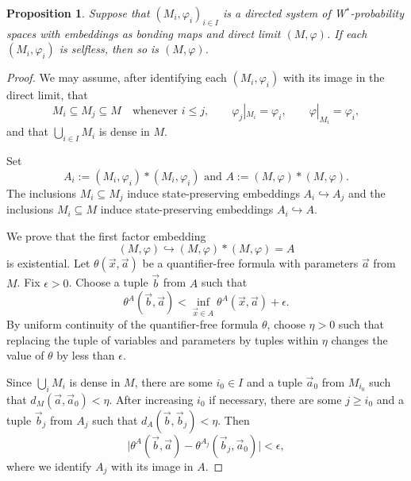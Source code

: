 \documentclass[12pt]{amsart}
\newtheorem{prop}[thm]{Proposition}
\theoremstyle{definition}
\begin{document}
\begin{prop}\label{limit}
Suppose that $(M_i,\varphi_i)_{i\in I}$ is a directed system of W$^*$-probability spaces with embeddings as bonding maps and direct limit $(M,\varphi)$.  If each $(M_i,\varphi_i)$ is selfless, then so is $(M,\varphi)$.
\end{prop}

\begin{proof}
We may assume, after identifying each $(M_i,\varphi_i)$ with its image in the direct limit, that
\[
        M_i\subseteq M_j\subseteq M
        \quad\text{whenever }i\leq j,
        \qquad
        \varphi_j|_{M_i}=\varphi_i,
        \qquad
        \varphi|_{M_i}=\varphi_i,
\]
and that $\bigcup_{i\in I}M_i$ is dense in $M$.

Set
$$A_i:=(M_i,\varphi_i)*(M_i,\varphi_i) \text{ and }
        A:=(M,\varphi)*(M,\varphi).$$
The inclusions $M_i\subseteq M_j$ induce state-preserving embeddings $A_i\hookrightarrow A_j$
and the inclusions $M_i\subseteq M$ induce state-preserving embeddings $A_i\hookrightarrow A$.

We prove that the first factor embedding
\[
        (M,\varphi)\hookrightarrow (M,\varphi)*(M,\varphi)=A
\]
is existential. Let $\theta(\vec x,\vec a)$ be a quantifier-free formula with parameters $\vec a$ from $M$.  Fix $\epsilon>0$. Choose a tuple $\vec b$ from $A$ such that
\[
        \theta^A(\vec b,\vec a)
        <
        \inf_{\vec x\in A}\theta^A(\vec x,\vec a)+\epsilon.
\]
By uniform continuity of the quantifier-free formula $\theta$, choose $\eta>0$ such that replacing the tuple of variables and parameters by tuples within $\eta$ changes the value of $\theta$ by less than $\epsilon$.

Since $\bigcup_i M_i$ is dense in $M$, there are some $i_0\in I$ and a tuple $\vec a_0$ from $M_{i_0}$ such that $d_M(\vec a,\vec a_0)<\eta$.
After increasing $i_0$ if necessary, there are some $j\geq i_0$ and a tuple $\vec b_j$ from $A_j$
such that $d_A(\vec b,\vec b_j)<\eta$.
Then
\[
        \bigl|\theta^A(\vec b,\vec a)-\theta^{A_j}(\vec b_j,\vec a_0)\bigr|<\epsilon,
\]
where we identify $A_j$ with its image in $A$.


\end{proof}
\end{document}
